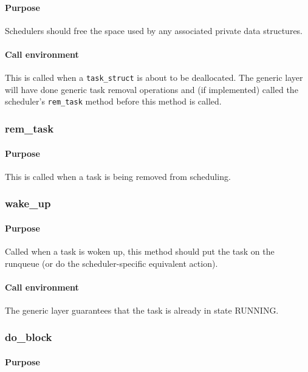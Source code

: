 \documentclass[11pt,twoside,final,openright]{xenstyle}
\begin{document}
\paragraph*{Purpose}

Schedulers should free the space used by any associated private data
structures.

\paragraph*{Call environment}

This is called when a {\tt task\_struct} is about to be deallocated.
The generic layer will have done generic task removal operations and
(if implemented) called the scheduler's {\tt rem\_task} method before
this method is called.

\subsubsection{rem\_task}

\paragraph*{Purpose}

This is called when a task is being removed from scheduling.

\subsubsection{wake\_up}

\paragraph*{Purpose}

Called when a task is woken up, this method should put the task on the runqueue
(or do the scheduler-specific equivalent action).

\paragraph*{Call environment}

The generic layer guarantees that the task is already in state
RUNNING.

\subsubsection{do\_block}

\paragraph*{Purpose}
\end{document}
